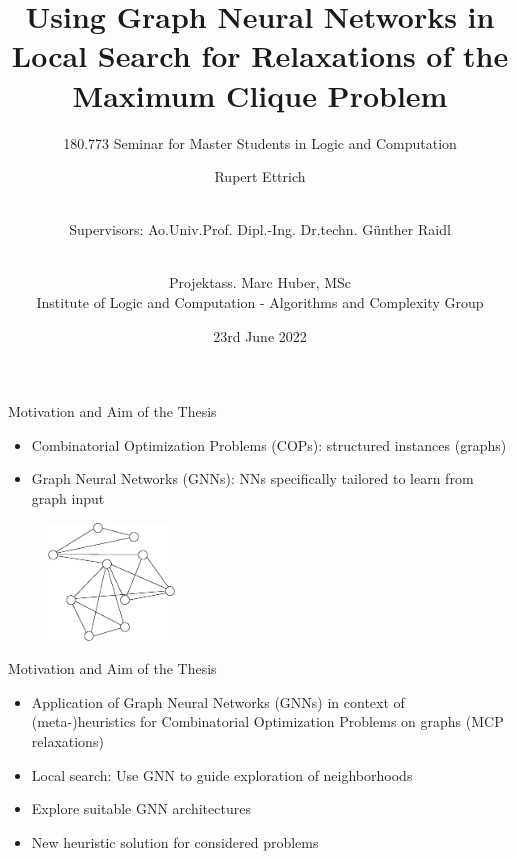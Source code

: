 \documentclass{beamer}
\title{Using Graph Neural Networks in Local Search for Relaxations of the Maximum Clique Problem}
\subtitle{180.773 Seminar for Master Students in Logic and Computation}
\author{Rupert Ettrich \and \\ \scriptsize Supervisors:  Ao.Univ.Prof. Dipl.-Ing. Dr.techn. Günther Raidl \and \\ Projektass. Marc Huber, MSc \\ Institute of Logic and Computation - Algorithms and Complexity Group}
\date{23rd June 2022}
\begin{document}
\maketitle

    

\begin{frame}{Motivation and Aim of the Thesis}
    \begin{itemize}
        \item<1-> Combinatorial Optimization Problems (COPs): structured instances (graphs)
        \item<2-> Graph Neural Networks (GNNs): NNs specifically tailored to learn from graph input 
    \end{itemize}
\begin{figure}
    \centering
    \includegraphics[width=0.3\textwidth]{graphics/graph1.eps}
\end{figure}
\end{frame}

\begin{frame}{Motivation and Aim of the Thesis}
    \begin{itemize}
        \item<1-> Application of Graph Neural Networks (GNNs) in context of (meta-)heuristics for Combinatorial Optimization Problems on graphs (MCP relaxations)
        \item<2-> Local search: Use GNN to guide exploration of neighborhoods
        \item<3-> Explore suitable GNN architectures
        \item<4-> New heuristic solution for considered problems
    \end{itemize}
\end{frame}
\end{document}
